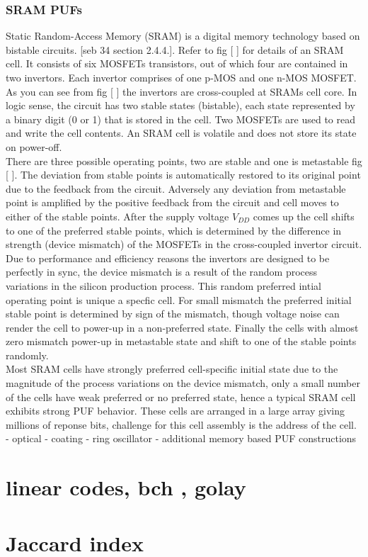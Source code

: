 \subsubsection{SRAM PUFs}
\label{srampufs}

Static Random-Access Memory (SRAM) is a digital memory technology based on bistable circuits. [seb 34 section 2.4.4.]. Refer to fig [ ] for details of an SRAM cell. It consists of six MOSFETs transistors, out of which four are contained in two invertors. Each invertor comprises of one p-MOS and one n-MOS MOSFET. As you can see from fig [ ] the invertors are cross-coupled at SRAMs cell core. In logic sense, the circuit has two stable states (bistable), each state represented by a binary
digit (0 or 1) that is stored in the cell. Two MOSFETs are used to read and write the cell contents. An SRAM cell is volatile and does not store its state on power-off.\\

There are three possible operating points, two are stable and one is metastable fig [ ]. The deviation from stable points is automatically restored to its original point due to the feedback from the circuit. Adversely any deviation from metastable point is amplified by the positive feedback from the circuit and cell moves to either of the stable points. After the supply voltage $V_{DD}$ comes up the cell shifts to one of the preferred stable points, which is determined by the difference in
strength (device mismatch) of the MOSFETs in the cross-coupled invertor circuit. Due to performance and efficiency reasons the invertors are designed to be perfectly in sync, the device mismatch is a result of the random process variations in the silicon production process. This random preferred intial operating point is unique a specfic cell. For small mismatch the preferred initial stable point is determined by sign of the mismatch, though voltage noise can render the cell to
power-up in a non-preferred state. Finally the cells with almost zero mismatch power-up in metastable state and shift to one of the stable points randomly.\\

Most SRAM cells have strongly preferred cell-specific initial state due to the magnitude of the process variations on the device mismatch, only a small number of the cells have weak preferred or no preferred state, hence a typical SRAM cell exhibits strong PUF behavior. These cells are arranged in a large array giving millions of reponse bits, challenge for this cell assembly is the address of the cell.\\


	- optical
	- coating
	- ring oscillator
	- additional memory based PUF constructions

\section{linear codes, bch , golay}

\section{Jaccard index}

